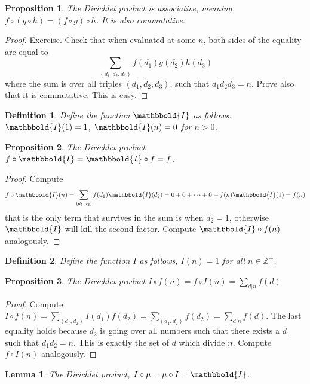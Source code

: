 \documentclass{article}
\theoremstyle{problemstyle}
\newtheorem{proposition}{Proposition}
\newtheorem{lemma}{Lemma}
\newtheorem{definition}{Definition}
\begin{document}
\begin{proposition}
The Dirichlet product is associative, meaning $f \circ (g \circ h) = (f\circ g) \circ h$.  It is also commutative.
\end{proposition}

\begin{proof}
Exercise. Check that when evaluated at some $n$, both sides of the equality are equal to $$\sum_{(d_1,d_2,d_3)}f(d_1)g(d_2)h(d_3)$$ where the sum is over all triples $(d_1,d_2,d_3)$, such that $d_1d_2d_3 = n$. Prove also that it is commutative. This is easy. 
\end{proof}


\begin{definition}
Define the function $\mathbbold{I}$ as follows: $\mathbbold{I}(1) = 1$, $\mathbbold{I}(n) = 0$ for $n >0$.  
\end{definition}

\begin{proposition}
The Dirichlet product $f\circ \mathbbold{I} = \mathbbold{I} \circ f = f$. 
\end{proposition}

\begin{proof}
Compute $$f\circ \mathbbold{I}(n) = \sum_{(d_1,d_2)}f(d_1)\mathbbold{I}(d_2) = 0+0+\cdots+0+f(n)\mathbbold{I}(1) = f(n)$$ that is the only term that survives in the sum is when $d_2 = 1$, otherwise $\mathbbold{I}$ will kill the second factor. Compute $\mathbbold{I}\circ f (n)$ analogously.
\end{proof}

\begin{definition}
Define the function $I$ as follows, $I(n) = 1$ for all $n \in \mathbb{Z}^+$.  
\end{definition}

\begin{proposition}
The Dirichlet product $I \circ f(n) = f \circ I(n) = \sum_{d|n}f(d)$
\end{proposition}

\begin{proof}
Compute $I \circ f(n) = \sum_{(d_1,d_2)}I(d_1)f(d_2) = \sum_{(d_1,d_2)}f(d_2) = \sum_{d|n}f(d)$. The last equality holds because $d_2$ is going over all numbers such that there exists a $d_1$ such that $d_1d_2 = n$. This is exactly the set of $d$ which divide $n$. Compute $f \circ I(n)$ analogously. 
\end{proof}

\begin{lemma}
The Dirichlet product, $I \circ \mu = \mu \circ I = \mathbbold{I}$. 
\end{lemma}
\end{document}
